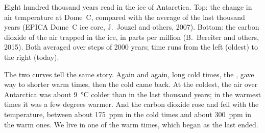 \begin{omfigure}

{\small Eight hundred thousand years read in the ice of Antarctica. Top:
the change in air temperature at Dome~C, compared with the average of the
last thousand years (EPICA Dome~C ice core, J.~Jouzel and others, 2007).
Bottom: the carbon dioxide of the air trapped in the ice, in parts per
million (B.~Bereiter and others, 2015). Both averaged over steps of
\num{2000} years; time runs from the left (oldest) to the right (today).}
\label{fig:g9:climate-past-and-present:icecore}
\end{omfigure}

The two curves tell the same story. Again and again, long cold times, the
, gave way to shorter warm times, then the cold came back. At the
coldest, the air over Antarctica was about \qty{9}{\degreeCelsius} colder
than in the last thousand years; in the warmest times it was a few
degrees warmer. And the carbon dioxide rose and fell with the temperature,
between about \qty{175}{ppm} in the cold times and about \qty{300}{ppm}
in the warm ones. We live in one of the warm times, which began as the
last  ended.

